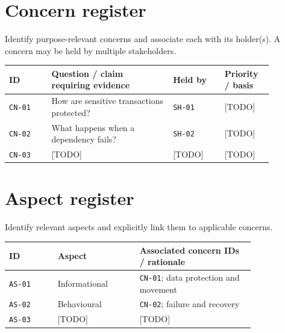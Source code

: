 \documentclass[11pt,letterpaper]{article}
\begin{document}
\section{Concern register \texorpdfstring{}{(6.4)}}
\begin{Requirement}\FlagReq{} Identify purpose-relevant concerns and associate each with its holder(s). A concern may be held by multiple stakeholders. \end{Requirement}
\begin{longtable}{p{0.14\linewidth}p{0.40\linewidth}p{0.17\linewidth}p{0.16\linewidth}}\toprule
\textbf{ID} & \textbf{Question / claim requiring evidence} & \textbf{Held by} & \textbf{Priority / basis}\\\midrule\endhead
\texttt{CN-01} & How are sensitive transactions protected? & \texttt{SH-01} & [TODO]\\
\texttt{CN-02} & What happens when a dependency fails? & \texttt{SH-02} & [TODO]\\
\texttt{CN-03} & [TODO] & [TODO] & [TODO]\\\bottomrule\end{longtable}
\section{Aspect register \texorpdfstring{}{(6.5)}}
\begin{Requirement}\FlagReq{} Identify relevant aspects and explicitly link them to applicable concerns. \end{Requirement}
\begin{longtable}{p{0.16\linewidth}p{0.27\linewidth}p{0.38\linewidth}}\toprule
\textbf{ID}&\textbf{Aspect}&\textbf{Associated concern IDs / rationale}\\\midrule\endhead
\texttt{AS-01}&Informational&\texttt{CN-01}; data protection and movement\\
\texttt{AS-02}&Behavioural&\texttt{CN-02}; failure and recovery\\
\texttt{AS-03}&[TODO]&[TODO]\\\bottomrule\end{longtable}
\end{document}
